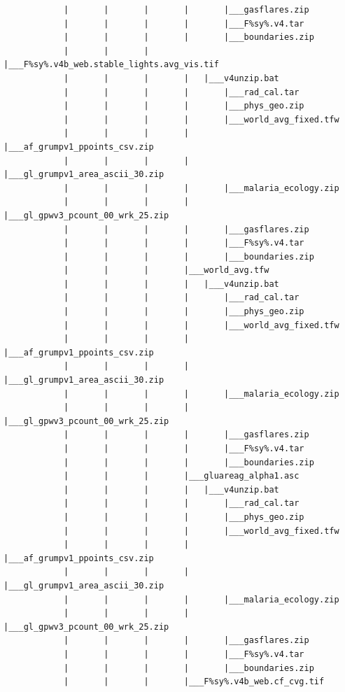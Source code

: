 \documentclass[
]{book}
\begin{document}
\begin{verbatim}
            |       |       |       |       |___gasflares.zip
            |       |       |       |       |___F%sy%.v4.tar
            |       |       |       |       |___boundaries.zip
            |       |       |       |___F%sy%.v4b_web.stable_lights.avg_vis.tif
            |       |       |       |   |___v4unzip.bat
            |       |       |       |       |___rad_cal.tar
            |       |       |       |       |___phys_geo.zip
            |       |       |       |       |___world_avg_fixed.tfw
            |       |       |       |       |___af_grumpv1_ppoints_csv.zip
            |       |       |       |       |___gl_grumpv1_area_ascii_30.zip
            |       |       |       |       |___malaria_ecology.zip
            |       |       |       |       |___gl_gpwv3_pcount_00_wrk_25.zip
            |       |       |       |       |___gasflares.zip
            |       |       |       |       |___F%sy%.v4.tar
            |       |       |       |       |___boundaries.zip
            |       |       |       |___world_avg.tfw
            |       |       |       |   |___v4unzip.bat
            |       |       |       |       |___rad_cal.tar
            |       |       |       |       |___phys_geo.zip
            |       |       |       |       |___world_avg_fixed.tfw
            |       |       |       |       |___af_grumpv1_ppoints_csv.zip
            |       |       |       |       |___gl_grumpv1_area_ascii_30.zip
            |       |       |       |       |___malaria_ecology.zip
            |       |       |       |       |___gl_gpwv3_pcount_00_wrk_25.zip
            |       |       |       |       |___gasflares.zip
            |       |       |       |       |___F%sy%.v4.tar
            |       |       |       |       |___boundaries.zip
            |       |       |       |___gluareag_alpha1.asc
            |       |       |       |   |___v4unzip.bat
            |       |       |       |       |___rad_cal.tar
            |       |       |       |       |___phys_geo.zip
            |       |       |       |       |___world_avg_fixed.tfw
            |       |       |       |       |___af_grumpv1_ppoints_csv.zip
            |       |       |       |       |___gl_grumpv1_area_ascii_30.zip
            |       |       |       |       |___malaria_ecology.zip
            |       |       |       |       |___gl_gpwv3_pcount_00_wrk_25.zip
            |       |       |       |       |___gasflares.zip
            |       |       |       |       |___F%sy%.v4.tar
            |       |       |       |       |___boundaries.zip
            |       |       |       |___F%sy%.v4b_web.cf_cvg.tif

\end{verbatim}
\end{document}
